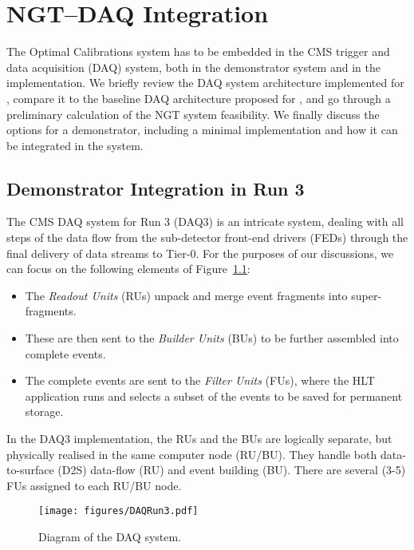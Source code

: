 \chapter{NGT--DAQ Integration} \label{sec:NGT-DAQintegration}

The Optimal Calibrations system has to be embedded in the CMS trigger and data acquisition (DAQ) system,
both in the demonstrator system and in the \Phasetwo implementation. We briefly review the DAQ system architecture implemented for \Runthree, compare it to the baseline DAQ architecture proposed for \Phasetwo, and go through a preliminary calculation of the NGT system feasibility. We finally discuss the options for a demonstrator, including a minimal implementation and how it can be integrated in the \Runthree system.

\section{Demonstrator Integration in Run 3}

The CMS DAQ system for Run 3 (DAQ3) is an intricate system, dealing with all steps of the data flow from the sub-detector front-end drivers (FEDs) through the final delivery of data streams to Tier-0. For the purposes of our discussions, we can focus on the following elements of Figure~\ref{fig:DAQ3}: 
\begin{itemize}
    \item The \emph{Readout Units} (RUs) unpack and merge event fragments into super-fragments.
    \item These are then sent to the \emph{Builder Units} (BUs) to be further assembled into complete events.
    \item The complete events are sent to the \emph{Filter Units} (FUs), where the HLT application runs and selects a subset of the events to be saved for permanent storage. 
\end{itemize}

In the DAQ3 implementation, the RUs and the BUs are logically separate, but physically realised in the same computer node (RU/BU). They handle both data-to-surface (D2S) data-flow (RU) and event building (BU). There are several (3-5) FUs assigned to each RU/BU node.

\begin{figure}[htbp]
   \centering
	\texttt{[image: figures/DAQRun3.pdf]}
  \caption{Diagram of the \Runthree DAQ system.}
   \label{fig:DAQ3}
\end{figure}

